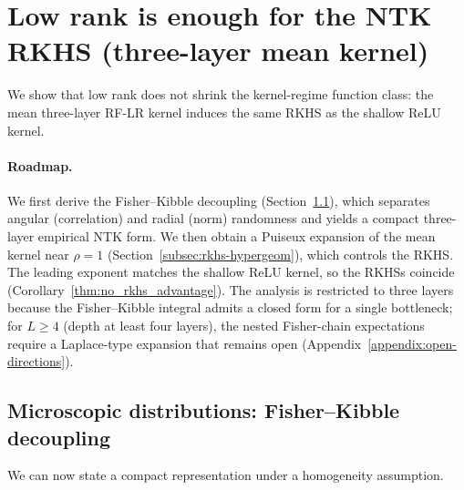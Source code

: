 \section{Low rank is enough for the NTK RKHS (three-layer mean kernel)}\label{sec:no-rkhs-advantage}
\noindent
We show that low rank does not shrink the kernel-regime function class: the mean three-layer RF-LR kernel induces the same RKHS as the shallow ReLU kernel.

\paragraph{Roadmap.}
We first derive the Fisher--Kibble decoupling (Section~\ref{subsec:fisher-kibble-main}), which separates angular (correlation) and radial (norm) randomness and yields a compact three-layer empirical NTK form. We then obtain a Puiseux expansion of the mean kernel near \(\rho=1\) (Section~\ref{subsec:rkhs-hypergeom}), which controls the RKHS. The leading exponent matches the shallow ReLU kernel, so the RKHSs coincide (Corollary~\ref{thm:no_rkhs_advantage}). The analysis is restricted to three layers because the Fisher--Kibble integral admits a closed form for a single bottleneck; for \(L\ge 4\) (depth at least four layers), the nested Fisher-chain expectations require a Laplace-type expansion that remains open (Appendix~\ref{appendix:open-directions}).

\subsection{Microscopic distributions: Fisher--Kibble decoupling}\label{subsec:fisher-kibble-main}
We can now state a compact representation under a homogeneity assumption.


